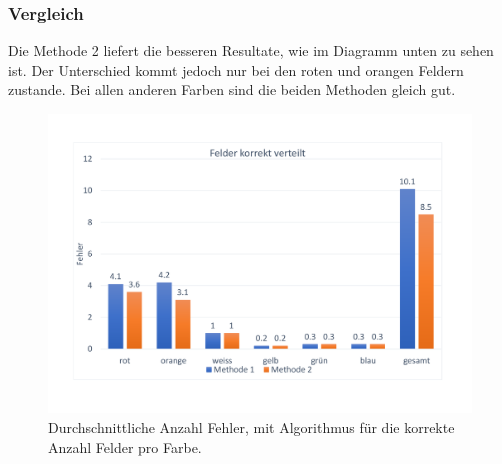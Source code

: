 \documentclass[a4paper, 12pt]{article}
\begin{document}
\subsubsection{Vergleich}
Die Methode 2 liefert die besseren Resultate, wie im Diagramm unten zu sehen ist. Der Unterschied kommt jedoch nur bei den roten und orangen Feldern zustande. Bei allen anderen Farben sind die beiden Methoden gleich gut.
\begin{figure}[H]
\includegraphics[scale=0.4]{Felder_korrekt_verteilt}
\caption{Durchschnittliche Anzahl Fehler, mit Algorithmus für die korrekte Anzahl Felder pro Farbe.}
\end{figure} 
\newpage
\end{document}

